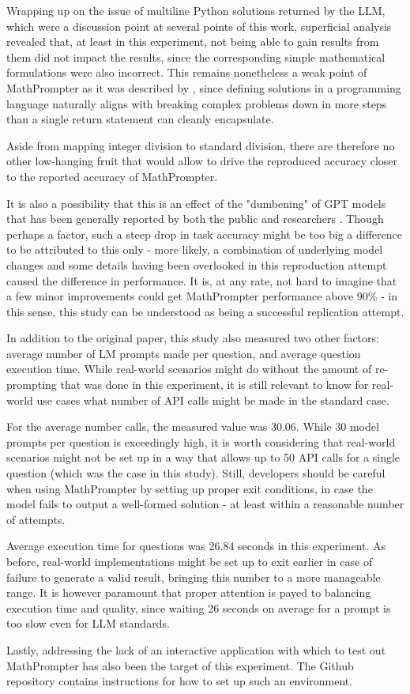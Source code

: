 \label{ref:reflection}

Wrapping up on the issue of multiline Python solutions returned by the LLM, which were a discussion point at several points of this work, superficial analysis revealed that, at least in this experiment, not being able to gain results from them did not impact the results, since the corresponding simple mathematical formulations were also incorrect. This remains nonetheless a weak point of MathPrompter as it was described by \citealp{imani-etal-2023-mathprompter}, since defining solutions in a programming language naturally aligns with breaking complex problems down in more steps than a single return statement can cleanly encapsulate.

Aside from mapping integer division to standard division, there are therefore no other low-hanging fruit that would allow to drive the reproduced accuracy closer to the reported accuracy of MathPrompter. 

It is also a possibility that this is an effect of the "dumbening" of GPT models that has been generally reported by both the public and researchers \citep{chen2023chatgpts}. Though perhaps a factor, such a steep drop in task accuracy might be too big a difference to be attributed to this only - more likely, a combination of underlying model changes and some details having been overlooked in this reproduction attempt caused the difference in performance. It is, at any rate, not hard to imagine that a few minor improvements could get MathPrompter performance above 90\% - in this sense, this study can be understood as being a successful replication attempt.

In addition to the original paper, this study also measured two other factors: average number of LM prompts made per question, and average question execution time. While real-world scenarios might do without the amount of re-prompting that was done in this experiment, it is still relevant to know for real-world use cases what number of API calls might be made in the standard case. 

For the average number calls, the measured value was 30.06. While 30 model prompts per question is exceedingly high, it is worth considering that real-world scenarios might not be set up in a way that allows up to 50 API calls for a single question (which was the case in this study). Still, developers should be careful when using MathPrompter by setting up proper exit conditions, in case the model fails to output a well-formed solution - at least within a reasonable number of attempts.

Average execution time for questions was 26.84 seconds in this experiment. As before, real-world implementations might be set up to exit earlier in case of failure to generate a valid result, bringing this number to a more manageable range. It is however paramount that proper attention is payed to balancing execution time and quality, since waiting 26 seconds on average for a prompt is too slow even for LLM standards.

Lastly, addressing the lack of an interactive application with which to test out MathPrompter has also been the target of this experiment. The Github repository contains instructions for how to set up such an environment.